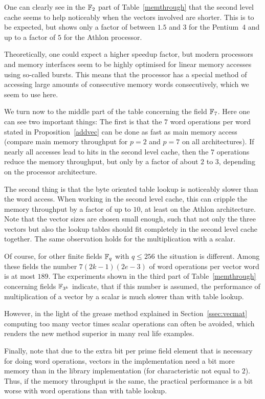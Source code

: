 One can clearly see in the $\mathbb{F}_2$ part of
Table~\ref{memthrough} that the second level cache seems to help noticeably
when the vectors involved are shorter. This is to be expected, but shows
only a factor of between $1.5$ and $3$ for the Pentium~4 and up to 
a factor of $5$ for the Athlon processor.

Theoretically, one could expect a higher speedup factor, but modern
processors and memory interfaces seem to be highly optimised for 
linear memory accesses using so-called bursts. This means that the
processor has a special method of accessing large amounts of consecutive
memory words consecutively, which we seem to use here.

We turn now to the middle part of the table concerning the field $\mathbb{F}_7$.
Here one can see two important things: The first is that the $7$ word
operations per word stated in Proposition~\ref{addvec} can be done as
fast as main memory access (compare main memory throughput for $p=2$ and
$p=7$ on all architectures). If nearly all accesses lead to hits in 
the second level cache, then the $7$ operations reduce the memory
throughput, but only by a factor of about $2$ to $3$, depending on
the processor architecture.

The second thing is that the byte oriented table lookup is noticeably
slower than the word access. When working in the second level cache,
this can cripple the memory throughput by a factor of up to $10$, at least on
the Athlon architecture. Note that the vector sizes are chosen small
enough, such that not only the three vectors but also the lookup tables
should fit completely in the second level cache together.
The same observation holds for the multiplication with a scalar. 

Of course, for other finite fields $\mathbb{F}_q$ with $q \le 256$ the situation
is different. Among these fields the number $7(2k-1)(2e-3)$ of word
operations per vector word is at most $189$. The experiments shown in
the third part of Table~\ref{memthrough} concerning fields $\mathbb{F}_{3^k}$ 
indicate, that
if this number is assumed, the performance of multiplication of a vector
by a scalar is much slower than with table lookup. 

However, in the light of the grease method explained in
Section~\ref{ssec:vecmat} computing too many vector times scalar 
operations can often be avoided, which renders the new method
superior in many real life examples.

Finally, note that due to the extra bit per prime field element that
is necessary for doing word operations, vectors in the {\cvec}
implementation need a bit more memory than in the {\GAP} library
implementation (for characteristic not equal to $2$).
Thus, if the memory throughput is the same, the practical performance is 
a bit worse with word operations than with table lookup.

